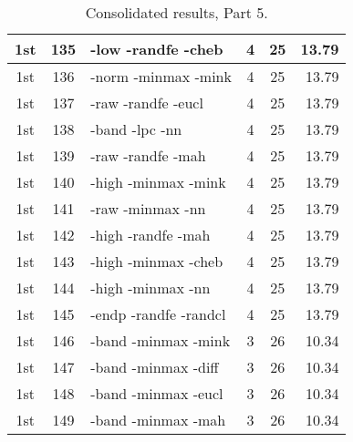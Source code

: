 \begin{table}
\begin{minipage}[b]{\textwidth}
\begin{tabular}{|c|c|l|c|c|r|}
1st & 135 & -low -randfe -cheb  & 4 & 25 & 13.79\\ \hline
1st & 136 & -norm -minmax -mink  & 4 & 25 & 13.79\\ \hline
1st & 137 & -raw -randfe -eucl  & 4 & 25 & 13.79\\ \hline
1st & 138 & -band -lpc -nn  & 4 & 25 & 13.79\\ \hline
1st & 139 & -raw -randfe -mah  & 4 & 25 & 13.79\\ \hline
1st & 140 & -high -minmax -mink  & 4 & 25 & 13.79\\ \hline
1st & 141 & -raw -minmax -nn  & 4 & 25 & 13.79\\ \hline
1st & 142 & -high -randfe -mah  & 4 & 25 & 13.79\\ \hline
1st & 143 & -high -minmax -cheb  & 4 & 25 & 13.79\\ \hline
1st & 144 & -high -minmax -nn  & 4 & 25 & 13.79\\ \hline
1st & 145 & -endp -randfe -randcl  & 4 & 25 & 13.79\\ \hline
1st & 146 & -band -minmax -mink  & 3 & 26 & 10.34\\ \hline
1st & 147 & -band -minmax -diff  & 3 & 26 & 10.34\\ \hline
1st & 148 & -band -minmax -eucl  & 3 & 26 & 10.34\\ \hline
1st & 149 & -band -minmax -mah  & 3 & 26 & 10.34\\ \hline
\end{tabular}
\end{minipage}
\caption{Consolidated results, Part 5.}
\label{tab:results5}
\end{table}

